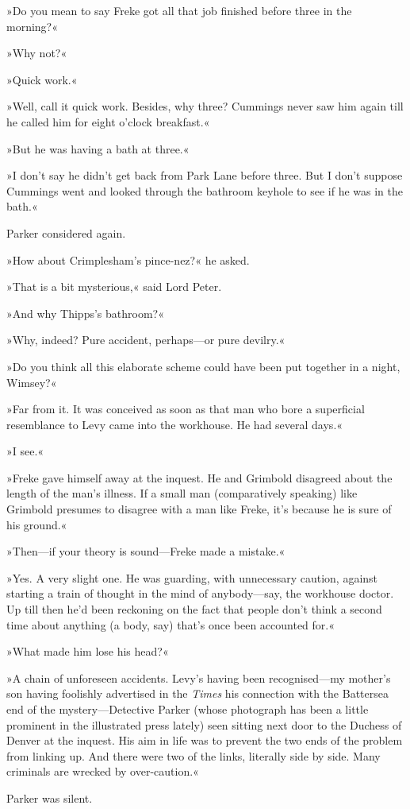 »Do you mean to say Freke got all that job finished before three in the morning?«

»Why not?«

»Quick work.«

»Well, call it quick work. Besides, why three? Cummings never saw him again till he called him for eight o'clock breakfast.«

»But he was having a bath at three.«

»I don't say he didn't get back from Park Lane before three. But I don't suppose Cummings went and looked through the bathroom keyhole to see if he was in the bath.«

Parker considered again.

»How about Crimplesham's pince-nez?« he asked.

»That is a bit mysterious,« said Lord Peter.

»And why Thipps's bathroom?«

»Why, indeed? Pure accident, perhaps—or pure devilry.«

»Do you think all this elaborate scheme could have been put together in a night, Wimsey?«

»Far from it. It was conceived as soon as that man who bore a superficial resemblance to Levy came into the workhouse. He had several days.«

»I see.«

»Freke gave himself away at the inquest. He and Grimbold disagreed about the length of the man's illness. If a small man (comparatively speaking) like Grimbold presumes to disagree with a man like Freke, it's because he is sure of his ground.«

»Then—if your theory is sound—Freke made a mistake.«

»Yes. A very slight one. He was guarding, with unnecessary caution, against starting a train of thought in the mind of anybody—say, the workhouse doctor. Up till then he'd been reckoning on the fact that people don't think a second time about anything (a body, say) that's once been accounted for.«

»What made him lose his head?«

»A chain of unforeseen accidents. Levy's having been recognised—my mother's son having foolishly advertised in the \textit{Times} his connection with the Battersea end of the mystery—Detective Parker (whose photograph has been a little prominent in the illustrated press lately) seen sitting next door to the Duchess of Denver at the inquest. His aim in life was to prevent the two ends of the problem from linking up. And there were two of the links, literally side by side. Many criminals are wrecked by over-caution.«

Parker was silent.
